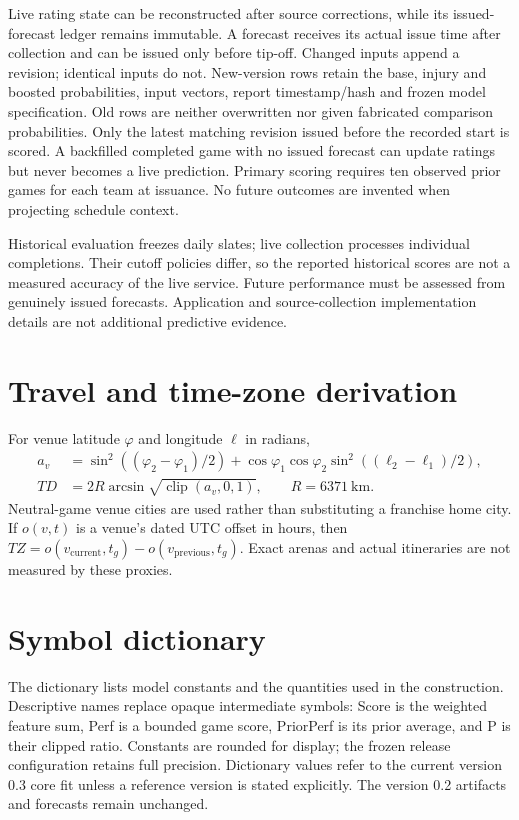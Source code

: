 \documentclass[11pt]{article}
\begin{document}
Live rating state can be reconstructed after source corrections, while its
issued-forecast ledger remains immutable. A forecast receives its actual
issue time after collection and can be issued only before tip-off. Changed
inputs append a revision; identical inputs do not. New-version rows retain
the base, injury and boosted probabilities, input vectors, report timestamp/hash
and frozen model specification. Old rows are neither overwritten nor given
fabricated comparison probabilities. Only the latest matching
revision issued before the recorded start is scored. A backfilled completed
game with no issued forecast can update ratings but never becomes a live
prediction. Primary scoring requires ten observed prior games for each team
at issuance. No future outcomes are invented when projecting schedule context.

Historical evaluation freezes daily slates; live collection processes
individual completions. Their cutoff policies differ, so the reported
historical scores are not a measured accuracy of the live service. Future
performance must be assessed from genuinely issued forecasts. Application
and source-collection implementation details are not additional predictive
evidence.

\appendix
\section{Travel and time-zone derivation}
For venue latitude $\varphi$ and longitude $\ell$ in radians,
\begin{align}
 a_v&=\sin^2((\varphi_2-\varphi_1)/2)
 +\cos\varphi_1\cos\varphi_2\sin^2((\ell_2-\ell_1)/2),\\
 TD&=2R\arcsin\sqrt{\operatorname{clip}(a_v,0,1)},\qquad R=6371\ \text{km}.
\end{align}
Neutral-game venue cities are used rather than substituting a franchise home
city. If $o(v,t)$ is a venue's dated UTC offset in hours, then
$TZ=o(v_{\mathrm{current}},t_g)-o(v_{\mathrm{previous}},t_g)$.
Exact arenas and actual itineraries are not measured by these proxies.

\clearpage
\section{Symbol dictionary}\label{app:symbols}
The dictionary lists model constants and the quantities used in the construction. Descriptive
names replace opaque intermediate symbols: Score is the weighted feature
sum, Perf is a bounded game score, PriorPerf is its prior average, and P is
their clipped ratio. Constants are rounded for display; the frozen release
configuration retains full precision. Dictionary values refer to the current
version 0.3 core fit unless a reference version is stated explicitly.
The version 0.2 artifacts and forecasts remain unchanged.
\begingroup
\normalsize
\setlength{\tabcolsep}{4pt}
\renewcommand{\arraystretch}{1.14}
\end{document}
